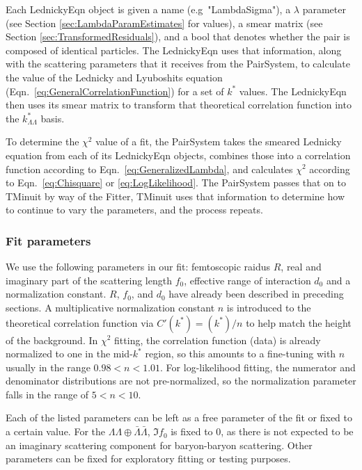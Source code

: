 Each LednickyEqn object is given a name (e.g\ "LambdaSigma"), a $\lambda$ parameter (see Section \ref{sec:LambdaParamEstimates} for values), a smear matrix (see Section \ref{sec:TransformedResiduals}), and a bool that denotes whether the pair is composed of identical particles.
The LednickyEqn uses that information, along with the scattering parameters that it receives from the PairSystem, to calculate the value of the Lednicky and Lyuboshits equation (Eqn.\ \ref{eq:GeneralCorrelationFunction}) for a set of $k^*$ values.
The LednickyEqn then uses its smear matrix to transform that theoretical correlation function into the $k^*_{\Lambda\Lambda}$ basis.

To determine the $\chi^2$ value of a fit, the PairSystem takes the smeared Lednicky equation from each of its LednickyEqn objects, combines those into a correlation function according to Eqn.\ \ref{eq:GeneralizedLambda}, and calculates $\chi^2$ according to Eqn.\ \ref{eq:Chisquare} or \ref{eq:LogLikelihood}.
The PairSystem passes that on to TMinuit by way of the Fitter, TMinuit uses that information to determine how to continue to vary the parameters, and the process repeats.

\subsubsection{Fit parameters}

We use the following parameters in our fit: femtoscopic raidus $R$, real and imaginary part of the scattering length $f_0$, effective range of interaction $d_0$ and a normalization constant.
$R$, $f_0$, and $d_0$ have already been described in preceding sections.
A multiplicative normalization constant $n$ is introduced to the theoretical correlation function via $C'(k^*) = (k^*)/n$ to help match the height of the background.
In $\chi^2$ fitting, the correlation function (data) is already normalized to one in the mid-$k^*$ region, so this amounts to a fine-tuning with $n$ usually in the range $0.98 < n < 1.01$.
For log-likelihood fitting, the numerator and denominator distributions are not pre-normalized, so the normalization parameter falls in the range of $5 < n < 10$.

Each of the listed parameters can be left as a free parameter of the fit or fixed to a certain value.
For the $\Lambda\Lambda \oplus \bar{\Lambda}\bar{\Lambda}$, $\Im f_0$ is fixed to 0, as there is not expected to be an imaginary scattering component for baryon-baryon scattering.
Other parameters can be fixed for exploratory fitting or testing purposes.

